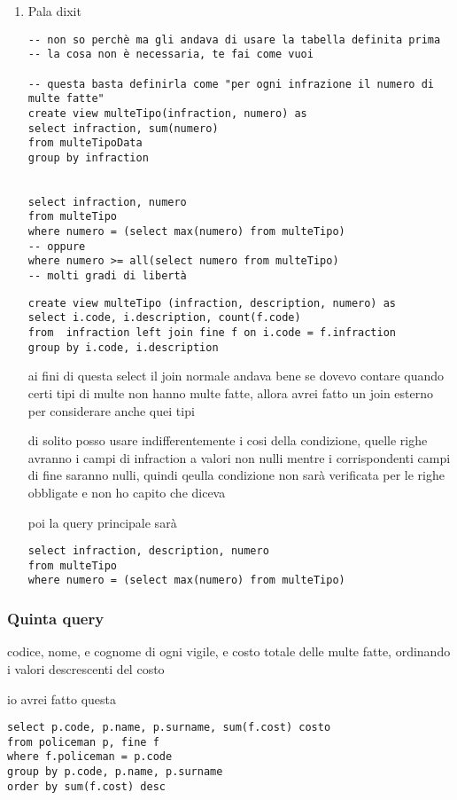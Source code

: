 \documentclass[11pt]{article}
\begin{document}
\begin{enumerate}
\item Pala dixit
\label{sec:org4f2ce6f}
\begin{verbatim}
-- non so perchè ma gli andava di usare la tabella definita prima
-- la cosa non è necessaria, te fai come vuoi

-- questa basta definirla come "per ogni infrazione il numero di multe fatte"
create view multeTipo(infraction, numero) as
select infraction, sum(numero)
from multeTipoData
group by infraction


select infraction, numero
from multeTipo
where numero = (select max(numero) from multeTipo)
-- oppure
where numero >= all(select numero from multeTipo)
-- molti gradi di libertà
\end{verbatim}


\begin{verbatim}
create view multeTipo (infraction, description, numero) as
select i.code, i.description, count(f.code)
from  infraction left join fine f on i.code = f.infraction
group by i.code, i.description
\end{verbatim}
ai fini di questa select il join normale andava bene
se dovevo contare quando certi tipi di multe non hanno multe fatte, allora avrei fatto un
join esterno per considerare anche quei tipi

di solito posso usare indifferentemente i cosi della condizione, quelle righe avranno i
campi di infraction a valori non nulli mentre i corrispondenti campi di fine saranno
nulli, quindi qeulla condizione non sarà verificata per le righe obbligate e non ho capito
che diceva

poi la query principale sarà
\begin{verbatim}
select infraction, description, numero
from multeTipo
where numero = (select max(numero) from multeTipo)
\end{verbatim}
\end{enumerate}

\subsubsection{Quinta query}
\label{sec:org75c28f4}
codice, nome, e cognome di ogni vigile, e costo totale delle multe fatte, ordinando i
valori descrescenti del costo

io avrei fatto questa
\begin{verbatim}
select p.code, p.name, p.surname, sum(f.cost) costo
from policeman p, fine f
where f.policeman = p.code
group by p.code, p.name, p.surname
order by sum(f.cost) desc
\end{verbatim}
\end{document}
